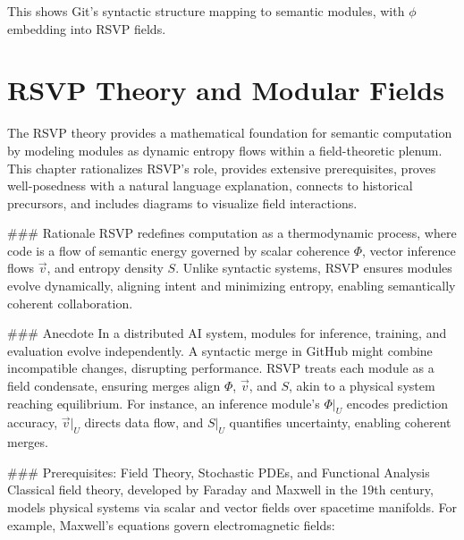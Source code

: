 \documentclass[12pt]{article}
\begin{document}
\begin{center}
\end{center}

This shows Git’s syntactic structure mapping to semantic modules, with $\phi$ embedding into RSVP fields.

\section{RSVP Theory and Modular Fields}
\label{sec:chapter2}

The RSVP theory provides a mathematical foundation for semantic computation by modeling modules as dynamic entropy flows within a field-theoretic plenum. This chapter rationalizes RSVP’s role, provides extensive prerequisites, proves well-posedness with a natural language explanation, connects to historical precursors, and includes diagrams to visualize field interactions.

### Rationale
RSVP redefines computation as a thermodynamic process, where code is a flow of semantic energy governed by scalar coherence $\Phi$, vector inference flows $\vec{v}$, and entropy density $S$. Unlike syntactic systems, RSVP ensures modules evolve dynamically, aligning intent and minimizing entropy, enabling semantically coherent collaboration.

### Anecdote
In a distributed AI system, modules for inference, training, and evaluation evolve independently. A syntactic merge in GitHub might combine incompatible changes, disrupting performance. RSVP treats each module as a field condensate, ensuring merges align $\Phi$, $\vec{v}$, and $S$, akin to a physical system reaching equilibrium. For instance, an inference module’s $\Phi|_U$ encodes prediction accuracy, $\vec{v}|_U$ directs data flow, and $S|_U$ quantifies uncertainty, enabling coherent merges.

### Prerequisites: Field Theory, Stochastic PDEs, and Functional Analysis
Classical field theory, developed by Faraday and Maxwell in the 19th century, models physical systems via scalar and vector fields over spacetime manifolds. For example, Maxwell’s equations govern electromagnetic fields:
\end{document}
